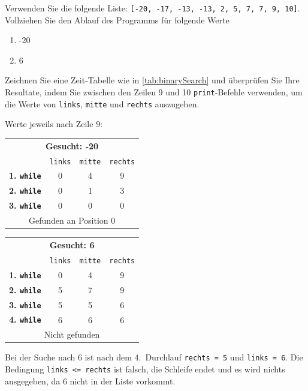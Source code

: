 \begin{myexercise}
	Verwenden Sie die folgende Liste: \lstinline|[-20, -17, -13, -13, 2, 5, 7, 7, 9, 10]|. Vollziehen Sie den Ablauf des Programms für folgende Werte
	\begin{enumerate}
		\item -20
		\item 6
	\end{enumerate}
	Zeichnen Sie eine Zeit-Tabelle wie in \cref{tab:binarySearch} und überprüfen Sie Ihre Resultate, indem Sie zwischen den Zeilen 9 und 10 \lstinline|print|-Befehle verwenden, um die Werte von \lstinline|links|, \lstinline|mitte| und \lstinline|rechts| auszugeben.
	\begin{myanswer}
		Werte jeweils nach Zeile 9:
		\begin{center}
			\begin{tabular}{lccc}
				\multicolumn{4}{c}{\textbf{Gesucht: -20}}                                  \\
				                              & \texttt{links} & \texttt{mitte} & \texttt{rechts} \\\midrule
				\textbf{1. \lstinline|while|} & 0              & 4              & 9               \\\midrule
				\textbf{2. \lstinline|while|} & 0              & 1              & 3               \\\midrule
				\textbf{3. \lstinline|while|} & 0              & 0              & 0               \\\midrule
				\multicolumn{4}{c}{Gefunden an Position 0}
			\end{tabular}
			\hspace{1cm}
			\begin{tabular}{lccc}
				\multicolumn{4}{c}{\textbf{Gesucht: 6}}                                     \\
				                              & \texttt{links} & \texttt{mitte} & \texttt{rechts} \\\midrule
				\textbf{1. \lstinline|while|} & 0              & 4              & 9               \\\midrule
				\textbf{2. \lstinline|while|} & 5              & 7              & 9               \\\midrule
				\textbf{3. \lstinline|while|} & 5              & 5              & 6               \\\midrule
				\textbf{4. \lstinline|while|} & 6              & 6              & 6               \\\midrule
				\multicolumn{4}{c}{Nicht gefunden}
			\end{tabular}
		\end{center}
		Bei der Suche nach 6 ist nach dem 4.~Durchlauf \lstinline|rechts = 5| und \lstinline|links = 6|. Die Bedingung \lstinline|links <= rechts| ist falsch, die Schleife endet und es wird nichts ausgegeben, da 6 nicht in der Liste vorkommt.
	\end{myanswer}
\end{myexercise}

